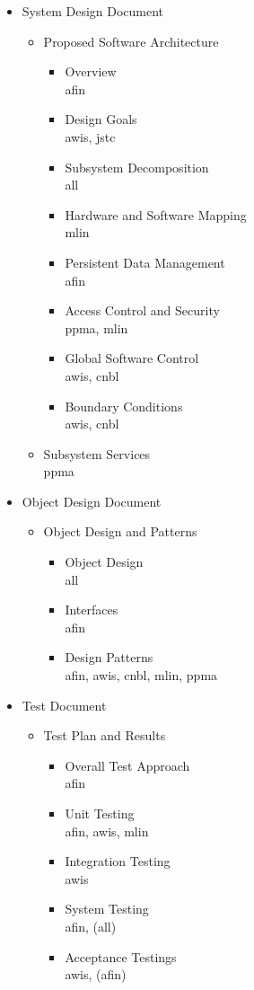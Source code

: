 \begin{itemize}
	\item System Design Document
	\begin{itemize}
	\item Proposed Software Architecture
	\begin{itemize}
		\item Overview\\
		afin
		\item Design Goals\\
		awis, jstc
		\item Subsystem Decomposition\\
		all
		\item Hardware and Software Mapping\\
		mlin
		\item Persistent Data Management\\
		afin
		\item Access Control and Security\\
		ppma, mlin
		\item Global Software Control\\
		awis, cnbl
		\item Boundary Conditions\\
		awis, cnbl
	\end{itemize}
	\item Subsystem Services\\
	ppma
	\end{itemize}
	\item Object Design Document
	\begin{itemize}
		\item Object Design and Patterns
		\begin{itemize}
			\item Object Design\\
			all
			\item Interfaces\\
			afin
			\item Design Patterns\\
			afin, awis, cnbl, mlin, ppma
		\end{itemize}
	\end{itemize}

	\item Test Document
	\begin{itemize}
		\item Test Plan and Results
		\begin{itemize}
			\item Overall Test Approach\\
			afin
			\item Unit Testing\\
			afin, awis, mlin
			\item Integration Testing\\
			awis
			\item System Testing\\
			afin, (all)
			\item Acceptance Testings\\
			awis, (afin)
		\end{itemize}
	\end{itemize}


\end{itemize}
